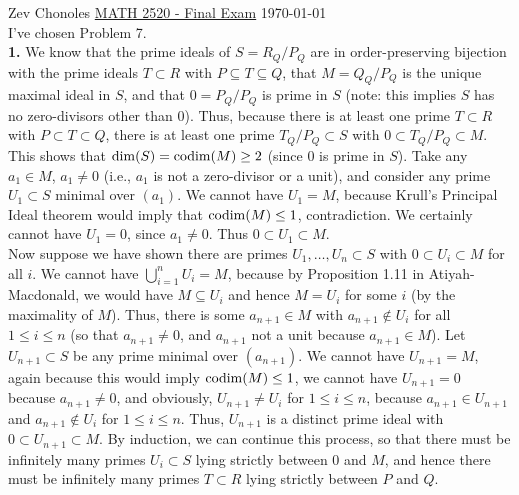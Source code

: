 \documentclass[11pt]{article}
\begin{document}
Zev Chonoles \hfill 
\underline{MATH 2520 - Final Exam} \hfill \today\\

I've chosen Problem 7.\\

{\sf\textbf{1.}} We know that the prime ideals of $S=R_Q/P_Q$ are in
order-preserving bijection with the prime ideals $T\subset R$ with $P\subseteq
T\subseteq Q$, that $M=Q_Q/P_Q$ is the unique maximal ideal in $S$, and that
$0=P_Q/P_Q$ is prime in $S$ (note: this implies $S$ has no zero-divisors
other than 0). Thus, because there is at least one prime $T\subset R$
with $P\subset T\subset Q$, there is at least one prime $T_Q/P_Q\subset S$
with $0\subset T_Q/P_Q\subset M$. This shows that $\operatorname{dim}(S)=\operatorname{codim}(M)\geq 2$
(since 0 is prime in $S$). Take any $a_1\in M$, $a_1\neq 0$ (i.e., $a_1$
is not a zero-divisor or a unit), and consider any prime $U_1\subset S$
minimal over $(a_1)$. We cannot have $U_1=M$, because Krull's Principal
Ideal theorem would imply that $\operatorname{codim}(M)\leq 1$, contradiction. We certainly
cannot have $U_1=0$, since $a_1\neq 0$. Thus $0\subset U_1\subset M$. \\

Now suppose we have shown there are primes $U_1,\ldots,U_n\subset S$ with
$0\subset U_i\subset M$ for all $i$. We cannot have $\bigcup_{i=1}^n U_i=M$,
because by Proposition 1.11 in Atiyah-Macdonald, we would have $M\subseteq
U_i$ and hence $M=U_i$ for some $i$ (by the maximality of $M$). Thus, there
is some $a_{n+1}\in M$ with $a_{n+1}\notin U_i$ for all $1\leq i\leq n$ (so
that $a_{n+1}\neq0$, and $a_{n+1}$ not a unit because $a_{n+1}\in M$). Let
$U_{n+1}\subset S$ be any prime minimal over $(a_{n+1})$. We cannot have
$U_{n+1}=M$, again because this would imply $\operatorname{codim}(M)\leq 1$, we cannot
have $U_{n+1}=0$ because $a_{n+1}\neq0$, and obviously, $U_{n+1}\neq U_i$
for $1\leq i\leq n$, because $a_{n+1}\in U_{n+1}$ and $a_{n+1}\notin U_i$
for $1\leq i\leq n$. Thus, $U_{n+1}$ is a distinct prime ideal with $0\subset
U_{n+1}\subset M$. By induction, we can continue this process, so that there
must be infinitely many primes $U_i\subset S$ lying strictly between 0 and $M$,
and hence there must be infinitely many primes $T\subset R$ lying strictly
between $P$ and $Q$. \\
\end{document}
